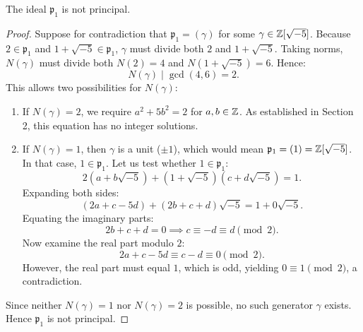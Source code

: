 \documentclass[a4paper]{article}
\begin{document}
\begin{proposition}
The ideal $\mathfrak{p}_1$ is not principal.
\end{proposition}
\begin{proof}
Suppose for contradiction that $\mathfrak{p}_1 = (\gamma)$ for some $\gamma \in \mathbb{Z}[\sqrt{-5}]$.
Because $2 \in \mathfrak{p}_1$ and $1 + \sqrt{-5} \in \mathfrak{p}_1$, $\gamma$ must divide both $2$ and $1 + \sqrt{-5}$. 
Taking norms, $N(\gamma)$ must divide both $N(2) = 4$ and $N(1+\sqrt{-5}) = 6$. Hence:
\begin{equation}
 N(\gamma) \mid \gcd(4, 6) = 2.
\end{equation}
This allows two possibilities for $N(\gamma)$:
\begin{enumerate}
 \item If $N(\gamma) = 2$, we require $a^2 + 5b^2 = 2$ for $a, b \in \mathbb{Z}$. As established in Section 2, this equation has no integer solutions.
 \item If $N(\gamma) = 1$, then $\gamma$ is a unit ($\pm 1$), which would mean $\mathfrak{p}_1 = (1) = \mathbb{Z}[\sqrt{-5}]$. In that case, $1 \in \mathfrak{p}_1$. 
 Let us test whether $1 \in \mathfrak{p}_1$:
 \begin{equation}
  2(a + b\sqrt{-5}) + (1 + \sqrt{-5})(c + d\sqrt{-5}) = 1.
 \end{equation}
 Expanding both sides:
 \begin{equation}
  (2a + c - 5d) + (2b + c + d)\sqrt{-5} = 1 + 0\sqrt{-5}.
 \end{equation}
 Equating the imaginary parts:
 \begin{equation}
  2b + c + d = 0 \implies c \equiv -d \equiv d \pmod 2.
 \end{equation}
 Now examine the real part modulo $2$:
 \begin{equation}
  2a + c - 5d \equiv c - d \equiv 0 \pmod 2.
 \end{equation}
 However, the real part must equal $1$, which is odd, yielding $0 \equiv 1 \pmod 2$, a contradiction.
\end{enumerate}
Since neither $N(\gamma) = 1$ nor $N(\gamma) = 2$ is possible, no such generator $\gamma$ exists. Hence $\mathfrak{p}_1$ is not principal.
\end{proof}
\end{document}
